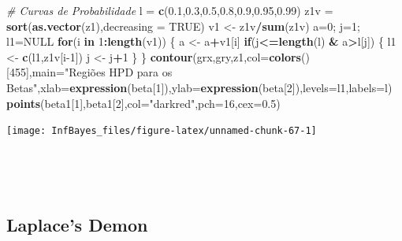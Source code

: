 \documentclass[
]{book}
\newenvironment{Shaded}{\begin{snugshade}}{\end{snugshade}}
\newcommand{\CommentTok}[1]{\textcolor[rgb]{0.56,0.35,0.01}{\textit{#1}}}
\newcommand{\ControlFlowTok}[1]{\textcolor[rgb]{0.13,0.29,0.53}{\textbf{#1}}}
\newcommand{\DataTypeTok}[1]{\textcolor[rgb]{0.13,0.29,0.53}{#1}}
\newcommand{\DecValTok}[1]{\textcolor[rgb]{0.00,0.00,0.81}{#1}}
\newcommand{\FloatTok}[1]{\textcolor[rgb]{0.00,0.00,0.81}{#1}}
\newcommand{\KeywordTok}[1]{\textcolor[rgb]{0.13,0.29,0.53}{\textbf{#1}}}
\newcommand{\NormalTok}[1]{#1}
\newcommand{\OperatorTok}[1]{\textcolor[rgb]{0.81,0.36,0.00}{\textbf{#1}}}
\newcommand{\OtherTok}[1]{\textcolor[rgb]{0.56,0.35,0.01}{#1}}
\newcommand{\StringTok}[1]{\textcolor[rgb]{0.31,0.60,0.02}{#1}}
\begin{document}
\begin{Shaded}
\begin{Highlighting}[]
\CommentTok{# Curvas de Probabilidade}
\NormalTok{l =}\StringTok{ }\KeywordTok{c}\NormalTok{(}\FloatTok{0.1}\NormalTok{,}\FloatTok{0.3}\NormalTok{,}\FloatTok{0.5}\NormalTok{,}\FloatTok{0.8}\NormalTok{,}\FloatTok{0.9}\NormalTok{,}\FloatTok{0.95}\NormalTok{,}\FloatTok{0.99}\NormalTok{)}
\NormalTok{z1v =}\StringTok{ }\KeywordTok{sort}\NormalTok{(}\KeywordTok{as.vector}\NormalTok{(z1),}\DataTypeTok{decreasing =} \OtherTok{TRUE}\NormalTok{)}
\NormalTok{v1 <-}\StringTok{ }\NormalTok{z1v}\OperatorTok{/}\KeywordTok{sum}\NormalTok{(z1v)}
\NormalTok{a=}\DecValTok{0}\NormalTok{; j=}\DecValTok{1}\NormalTok{; l1=}\OtherTok{NULL}
\ControlFlowTok{for}\NormalTok{(i }\ControlFlowTok{in} \DecValTok{1}\OperatorTok{:}\KeywordTok{length}\NormalTok{(v1)) \{}
\NormalTok{  a <-}\StringTok{ }\NormalTok{a}\OperatorTok{+}\NormalTok{v1[i]}
  \ControlFlowTok{if}\NormalTok{(j}\OperatorTok{<=}\KeywordTok{length}\NormalTok{(l) }\OperatorTok{&}\StringTok{ }\NormalTok{a}\OperatorTok{>}\NormalTok{l[j]) \{}
\NormalTok{    l1 <-}\StringTok{ }\KeywordTok{c}\NormalTok{(l1,z1v[i}\DecValTok{-1}\NormalTok{])}
\NormalTok{    j <-}\StringTok{ }\NormalTok{j}\OperatorTok{+}\DecValTok{1}
\NormalTok{  \}}
\NormalTok{\}}
\KeywordTok{contour}\NormalTok{(grx,gry,z1,}\DataTypeTok{col=}\KeywordTok{colors}\NormalTok{()[}\DecValTok{455}\NormalTok{],}\DataTypeTok{main=}\StringTok{"Regiões HPD para os Betas"}\NormalTok{,}\DataTypeTok{xlab=}\KeywordTok{expression}\NormalTok{(beta[}\DecValTok{1}\NormalTok{]),}\DataTypeTok{ylab=}\KeywordTok{expression}\NormalTok{(beta[}\DecValTok{2}\NormalTok{]),}\DataTypeTok{levels=}\NormalTok{l1,}\DataTypeTok{labels=}\NormalTok{l)}
\KeywordTok{points}\NormalTok{(beta1[}\DecValTok{1}\NormalTok{],beta1[}\DecValTok{2}\NormalTok{],}\DataTypeTok{col=}\StringTok{"darkred"}\NormalTok{,}\DataTypeTok{pch=}\DecValTok{16}\NormalTok{,}\DataTypeTok{cex=}\FloatTok{0.5}\NormalTok{)}
\end{Highlighting}
\end{Shaded}

\begin{center}\texttt{[image: InfBayes\_files/figure-latex/unnamed-chunk-67-1]} \end{center}

\(~\)

\(~\)

\hypertarget{laplaces-demon}{%
\subsection{Laplace's Demon}\label{laplaces-demon}}
\end{document}
